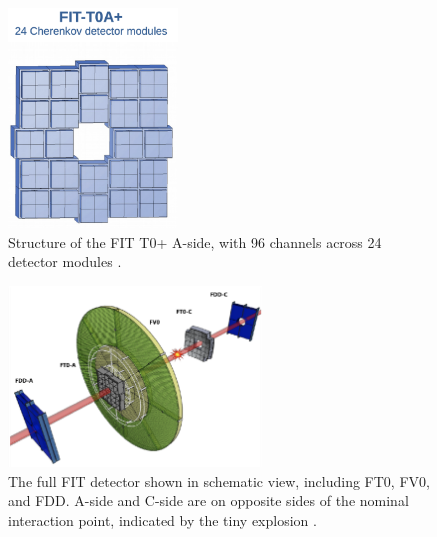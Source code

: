 \begin{figure}[H]
    \centering
    \includegraphics[width=0.4\textwidth]{figures/FIT/FT0A_Structure.png}
    \caption{Structure of the FIT T0+ A-side, with 96 channels across 24 detector modules \cite{Slupecki}.}
    \label{fig:my_label}
\end{figure}

\begin{figure}[H]
    \centering
    \includegraphics[width=0.6\textwidth]{figures/FIT/FIT_Layout.png}
    \caption{The full FIT detector shown in schematic view, including FT0, FV0, and FDD. A-side and C-side are on opposite sides of the nominal interaction point, indicated by the tiny explosion \cite{Contreras}.}
    \label{fig:FIT_Layout}
\end{figure}


